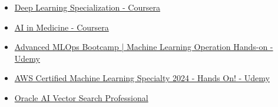 %
%
%

\vspace{1em}
\begin{itemize}
\item \href{http://coursera.org/verify/specialization/2NN4TTN5ZEL2}{Deep Learning Specialization - Coursera}
\item \href{http://coursera.org/verify/specialization/D6S5VMQ9LULV}{AI in Medicine - Coursera}
\item \href{https://www.udemy.com/certificate/UC-86d743a5-da0c-43cf-9335-21ff15ab1816/}{Advanced MLOps Bootcamp | Machine Learning Operation Hands-on - Udemy}
\item \href{https://www.udemy.com/certificate/UC-8d828880-dd76-41f0-89ee-288e92a45255/}{AWS Certified Machine Learning Specialty 2024 - Hands On! - Udemy}
\item \href{https://catalog-education.oracle.com/ords/certview/sharebadge?id=F400F94BF298ABB35891799C474D36F75090DD970364FEE7FEC7D08F87FBB7E2}{Oracle AI Vector Search Professional}
\end{itemize}
\vspace{-2.4pt}